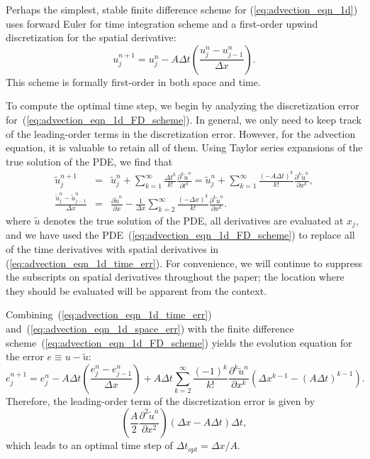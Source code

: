 \documentclass[fleqn,12pt,twoside]{article}
\newcommand{\beq}{\begin{equation}}
\newcommand{\eeq}{\end{equation}}
\newcommand{\bea}{\begin{eqnarray}}
\newcommand{\eea}{\end{eqnarray}}
\def\pt{\partial t}
\def\px{\partial x}
\def\tu{\tilde{u}}
\def\dt{\Delta t}
\def\dx{\Delta x}
\begin{document}
Perhaps the simplest, stable finite difference scheme 
for (\ref{eq:advection_eqn_1d}) uses forward Euler for time integration 
scheme and a first-order upwind discretization for the spatial derivative:
\beq
  u^{n+1}_j = u^{n}_j 
  - A \dt \left( \frac{u^{n}_j - u^{n}_{j-1}}{\dx} \right).
  \label{eq:advection_eqn_1d_FD_scheme}
\eeq
This scheme is formally first-order in both space and time.  

To compute the optimal time step, we begin by analyzing the discretization
error for~(\ref{eq:advection_eqn_1d_FD_scheme}).  In general, we only need to 
keep track of the leading-order terms in the discretization error.  However,
for the advection equation, it is valuable to retain all of them.  
Using Taylor series expansions of the true solution of the PDE, we find that 
\bea
  \tu^{n+1}_j &=& \tu^{n}_j 
  + \sum_{k=1}^\infty \frac{\dt^k}{k!} 
       \frac{\partial^k \tu^n}{\pt^k} 
  = \tu^{n}_j + \sum_{k=1}^\infty \frac{\left( -A \dt \right)^k}{k!} 
       \frac{\partial^k \tu^n}{\px^k},
  \label{eq:advection_eqn_1d_time_err} 
  \\
  \frac{\tu^{n}_j - \tu^{n}_{j-1}}{\dx} &=& 
  \frac{\partial \tu^n}{\px} 
  - \frac{1}{\dx} \sum_{k=2}^\infty \frac{\left( -\dx \right)^k}{k!} 
       \frac{\partial^k \tu^n}{\px^k}.
  \label{eq:advection_eqn_1d_space_err}
\eea
where $\tu$ denotes the true solution of the PDE, all derivatives are 
evaluated at $x_j$, and we have used the 
PDE~(\ref{eq:advection_eqn_1d_FD_scheme}) to replace all of the time 
derivatives with spatial derivatives in (\ref{eq:advection_eqn_1d_time_err}).
For convenience, we will continue to suppress the subscripts on spatial
derivatives throughout the paper; the location where they should be 
evaluated will be apparent from the context.

Combining~(\ref{eq:advection_eqn_1d_time_err}) 
and~(\ref{eq:advection_eqn_1d_space_err}) with the finite difference 
scheme~(\ref{eq:advection_eqn_1d_FD_scheme}) yields the evolution
equation for the error $e \equiv u - \tu$:
\beq
  e^{n+1}_j = e^{n}_j 
    - A \dt \left( \frac{e^{n}_j - e^{n}_{j-1}}{\dx} \right) 
    + A \dt \sum_{k=2}^\infty \frac{\left( -1 \right)^k}{k!} 
        \frac{\partial^k \tu^n}{\px^k} 
        \left( \dx^{k-1} - \left( A \dt \right)^{k-1} \right).
  \label{eq:advection_eqn_1d_err_eqn}
\eeq
Therefore, the leading-order term of the discretization error is given
by
\beq
  \left( \frac{A}{2} \frac{\partial^2 \tu^n}{\px^2} \right)
  \left( \dx - A \dt \right) \dt,
\eeq
which leads to an optimal time step of $\Delta t_{opt} = \Delta x / A$.
\end{document}
